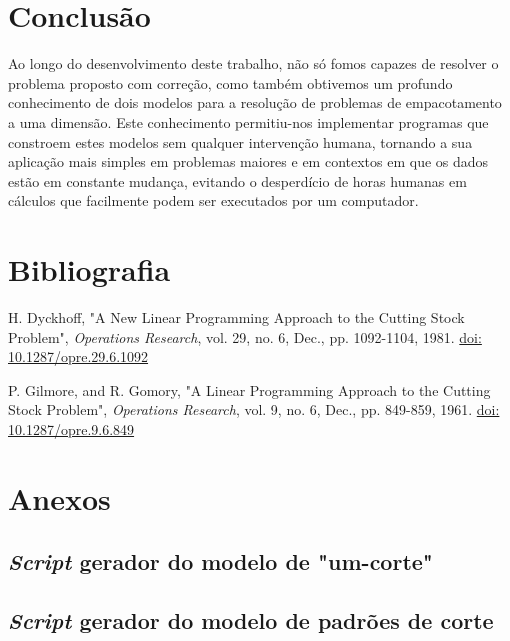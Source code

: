 \documentclass[12pt, a4paper, titlepage]{article}
\begin{document}
\section{Conclusão}

Ao longo do desenvolvimento deste trabalho, não só fomos capazes de resolver o problema proposto
com correção, como também obtivemos um profundo conhecimento de dois modelos para a resolução de
problemas de empacotamento a uma dimensão. Este conhecimento permitiu-nos implementar programas que
constroem estes modelos sem qualquer intervenção humana, tornando a sua aplicação mais simples em
problemas maiores e em contextos em que os dados estão em constante mudança, evitando o desperdício
de horas humanas em cálculos que facilmente podem ser executados por um computador.

\section{Bibliografia}
\def\refname{}
\vspace{-1.5cm}
\begin{thebibliography}{9}
    H. Dyckhoff, "A New Linear Programming Approach to the Cutting Stock Problem",
    \emph{Operations Research}, vol. 29, no. 6, Dec., pp. 1092-1104, 1981.
    \href{https://doi.org/10.1287/opre.29.6.1092}{doi: 10.1287/opre.29.6.1092}

    P. Gilmore, and R. Gomory, "A Linear Programming Approach to the Cutting Stock Problem",
    \emph{Operations Research}, vol. 9, no. 6, Dec., pp. 849-859, 1961.
    \href{https://doi.org/10.1287/opre.9.6.849}{doi: 10.1287/opre.9.6.849}
\end{thebibliography}

\section{Anexos}

\begin{landscape}
    \subsection{\emph{Script} gerador do modelo de "um-corte"{}}
    \label{code:one-cut}
    
    \pagebreak

    \subsection{\emph{Script} gerador do modelo de padrões de corte}
    \label{code:cutting-patterns}
    
\end{landscape}
\end{document}

